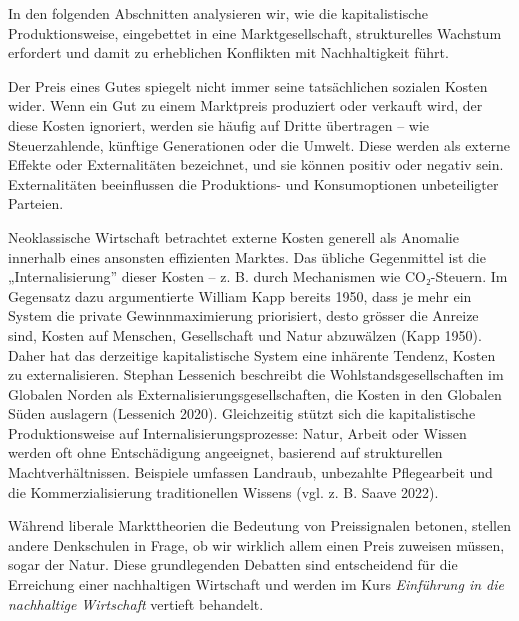 \documentclass[
  nswissgerman,
  a4paper,
  openany]{book}
\begin{document}
In den folgenden Abschnitten analysieren wir, wie die kapitalistische
Produktionsweise, eingebettet in eine Marktgesellschaft, strukturelles
Wachstum erfordert und damit zu erheblichen Konflikten mit
Nachhaltigkeit führt.

\begin{tcolorbox}[enhanced jigsaw, arc=.35mm, bottomrule=.15mm, bottomtitle=1mm, breakable, colback=white, colbacktitle=quarto-callout-note-color!10!white, colframe=quarto-callout-note-color-frame, coltitle=black, left=2mm, leftrule=.75mm, opacityback=0, opacitybacktitle=0.6, rightrule=.15mm, title={Internalisieren und Externalisieren}, titlerule=0mm, toprule=.15mm, toptitle=1mm]

Der Preis eines Gutes spiegelt nicht immer seine tatsächlichen sozialen
Kosten wider. Wenn ein Gut zu einem Marktpreis produziert oder verkauft
wird, der diese Kosten ignoriert, werden sie häufig auf Dritte
übertragen -- wie Steuerzahlende, künftige Generationen oder die Umwelt.
Diese werden als externe Effekte oder Externalitäten bezeichnet, und sie
können positiv oder negativ sein. Externalitäten beeinflussen die
Produktions- und Konsumoptionen unbeteiligter Parteien.

Neoklassische Wirtschaft betrachtet externe Kosten generell als Anomalie
innerhalb eines ansonsten effizienten Marktes. Das übliche Gegenmittel
ist die „Internalisierung'' dieser Kosten -- z. B. durch Mechanismen wie
CO₂-Steuern. Im Gegensatz dazu argumentierte William Kapp bereits 1950,
dass je mehr ein System die private Gewinnmaximierung priorisiert, desto
grösser die Anreize sind, Kosten auf Menschen, Gesellschaft und Natur
abzuwälzen (Kapp 1950). Daher hat das derzeitige kapitalistische System
eine inhärente Tendenz, Kosten zu externalisieren. Stephan Lessenich
beschreibt die Wohlstandsgesellschaften im Globalen Norden als
Externalisierungsgesellschaften, die Kosten in den Globalen Süden
auslagern (Lessenich 2020). Gleichzeitig stützt sich die kapitalistische
Produktionsweise auf Internalisierungsprozesse: Natur, Arbeit oder
Wissen werden oft ohne Entschädigung angeeignet, basierend auf
strukturellen Machtverhältnissen. Beispiele umfassen Landraub,
unbezahlte Pflegearbeit und die Kommerzialisierung traditionellen
Wissens (vgl. z. B. Saave 2022).

Während liberale Markttheorien die Bedeutung von Preissignalen betonen,
stellen andere Denkschulen in Frage, ob wir wirklich allem einen Preis
zuweisen müssen, sogar der Natur. Diese grundlegenden Debatten sind
entscheidend für die Erreichung einer nachhaltigen Wirtschaft und werden
im Kurs \emph{Einführung in die nachhaltige Wirtschaft} vertieft
behandelt.

\end{tcolorbox}
\end{document}
